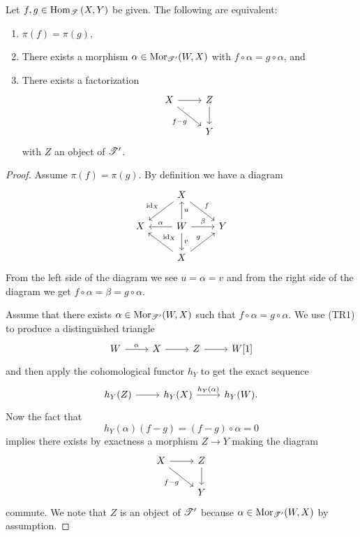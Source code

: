\documentclass[dissertation.tex]{subfiles}
\begin{document}
\begin{lem}\label{VerdierEqualizer}
  Let $f,g \in \operatorname{Hom}_{\mathscr{T}}\left(X,Y\right)$ be given.
  The following are equivalent:
  \begin{enumerate}
  \item
    $\pi(f) = \pi(g)$,
  \item
    There exists a morphism $\alpha \in \operatorname{Mor}_{\mathscr{T}^\prime}(W,X)$ with $f \circ \alpha = g \circ \alpha$, and
  \item
    There exists a factorization
    $$\begin{tikzcd}
      X \arrow{r}\arrow[swap]{rd}{f - g} & Z \arrow{d}\\
      & Y
    \end{tikzcd}$$
    with $Z$ an object of $\mathscr{T}^\prime$.
  \end{enumerate}
  
  \begin{proof}
    Assume $\pi(f) = \pi(g)$.
    By definition we have a diagram
    $$\begin{tikzcd}
      & X \arrow[swap]{ld}{\id_X} \arrow{rd}{f}\\
      X & W \arrow[swap]{l}{\alpha}\arrow[swap]{u}{u}\arrow{d}{v}\arrow{r}{\beta}& Y\\
      & X \arrow[swap]{ul}{\id_X}\arrow{ur}{g}
    \end{tikzcd}$$
    From the left side of the diagram we see $u = \alpha = v$ and from the right side of the diagram we get $f \circ \alpha = \beta = g \circ \alpha$.
    
    Assume that there exists $\alpha \in \operatorname{Mor}_{\mathscr{T}^\prime}(W,X)$ such that $f \circ \alpha = g \circ \alpha$.
    We use (TR1) to produce a distinguished triangle
    $$\begin{tikzcd}
      W \arrow{r}{\alpha} & X \arrow{r} & Z \arrow{r} & W[1]
    \end{tikzcd}$$
    and then apply the cohomological functor $h_Y$ to get the exact sequence
    $$\begin{tikzcd}
      h_Y(Z) \arrow{r} & h_Y(X) \arrow{r}{h_Y(\alpha)} & h_Y(W).
    \end{tikzcd}$$
    Now the fact that
    $$h_Y(\alpha)(f-g) = (f - g)\circ \alpha = 0$$
    implies there exists by exactness a morphism $Z \to Y$ making the diagram
    $$\begin{tikzcd}
      X \arrow{r}\arrow[swap]{rd}{f - g} & Z\arrow{d}\\
      & Y
    \end{tikzcd}$$
    commute.
    We note that $Z$ is an object of $\mathscr{T}^\prime$ because $\alpha \in \operatorname{Mor}_{\mathscr{T}^\prime}(W,X)$ by assumption.
    

\end{proof}
\end{lem}
\end{document}
